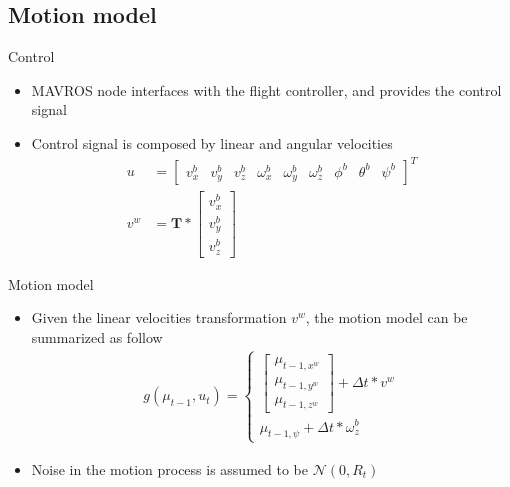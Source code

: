 \documentclass[serif,aspectratio=169]{beamer}
\begin{document}
    \subsection{Motion model}
    \begin{frame}{Control}
        \begin{itemize}
            \item{MAVROS node interfaces with the flight controller, and provides the control signal}
            \item{Control signal is composed by linear and angular velocities
                \begin{align*}
                    u &= \begin{bmatrix} v_x^b & v_y^b & v_z^b & \omega_x^b & \omega_y^b & \omega_z^b & \phi^b & \theta^b & \psi^b \end{bmatrix}^T\\
                    v^w &= \textbf{T} * \begin{bmatrix} v_x^b \\ v_y^b \\ v_z^b \end{bmatrix}
                \end{align*}
            }
        \end{itemize}
    \end{frame}
    \begin{frame}{Motion model}
        \begin{itemize}
            \item{Given the linear velocities transformation $v^w$, the motion model can be summarized as follow
                \begin{align*}
                    g\left( \mu_{t-1}, u_t \right) = \begin{cases}
                        \begin{bmatrix}
                            \mu_{t-1, x^w} \\ \mu_{t-1, y^w} \\ \mu_{t-1, z^w}
                        \end{bmatrix}
                        + \Delta t * v^w \\
                        \mu_{t-1, \psi} + \Delta t * \omega_z^b
                    \end{cases}
                \end{align*}
            }
        \item{Noise in the motion process is assumed to be $\mathcal{N}\left(0, R_t\right)$}
        \end{itemize}
    \end{frame}
\end{document}
